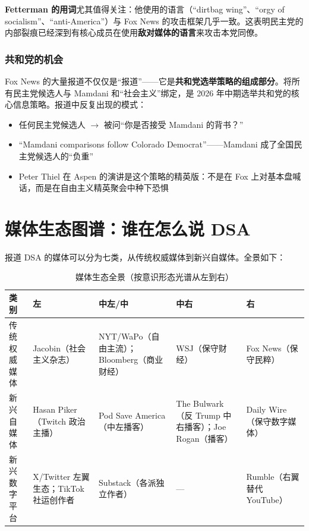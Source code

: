 \documentclass[12pt,a4paper]{ctexart}
\begin{document}
\textbf{Fetterman 的用词}尤其值得关注：他使用的语言（``dirtbag wing''、``orgy of socialism''、``anti-America''）与 Fox News 的攻击框架几乎一致。这表明民主党的内部裂痕已经深到有核心成员在使用\textbf{敌对媒体的语言}来攻击本党同僚。

\subsubsection{共和党的机会}

Fox News 的大量报道不仅仅是``报道''——它是\textbf{共和党选举策略的组成部分}。将所有民主党候选人与 Mamdani 和``社会主义''绑定，是 2026 年中期选举共和党的核心信息策略。报道中反复出现的模式：

\begin{itemize}
  \item 任何民主党候选人 $\rightarrow$ 被问``你是否接受 Mamdani 的背书？''
  \item ``Mamdani comparisons follow Colorado Democrat''——Mamdani 成了全国民主党候选人的``负重''
  \item Peter Thiel 在 Aspen 的演讲是这个策略的精英版：不是在 Fox 上对基本盘喊话，而是在自由主义精英聚会中种下恐惧
\end{itemize}

\section{媒体生态图谱：谁在怎么说 DSA}

报道 DSA 的媒体可以分为七类，从传统权威媒体到新兴自媒体。全景如下：

\begin{table}[h]
\centering
\caption{媒体生态全景（按意识形态光谱从左到右）}
\begin{tabular}{@{}p{1.7cm}p{3.3cm}p{3.9cm}p{3.0cm}p{2.6cm}@{}}
\toprule
\textbf{类别} & \textbf{左} & \textbf{中左/中} & \textbf{中右} & \textbf{右} \\
\midrule
传统权威媒体 & Jacobin（社会主义杂志） & NYT/WaPo（自由主流）；Bloomberg（商业财经） & WSJ（保守财经） & Fox News（保守民粹） \\
新兴自媒体 & Hasan Piker（Twitch 政治主播） & Pod Save America（中左播客） & The Bulwark（反 Trump 中右播客）；Joe Rogan（播客） & Daily Wire（保守数字媒体） \\
新兴数字平台 & X/Twitter 左翼生态；TikTok 社运创作者 & Substack（各派独立作者） & --- & Rumble（右翼替代 YouTube） \\
\bottomrule
\end{tabular}
\end{table}
\end{document}
